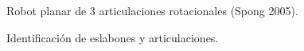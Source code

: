 \documentclass[a4paper,12pt]{article}
\begin{document}
\begin{figure}[H]
    \centering
    \begin{adjustbox}{scale = 0.85, max width=\columnwidth}
    \end{adjustbox}
    \caption{Robot planar de 3 articulaciones rotacionales (Spong 2005).}
\end{figure}

\begin{figure}[H]
    \centering
    \begin{adjustbox}{scale = 0.85, max width=\columnwidth}
    \end{adjustbox}
    \caption{Identificación de eslabones y articulaciones.}
\end{figure}
\end{document}
